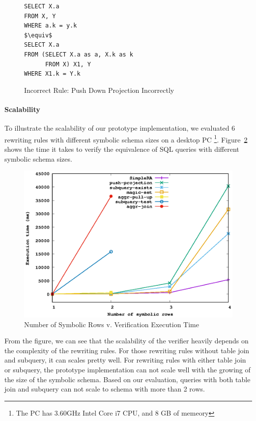 \begin{figure}[!htb]
\begin{lstlisting}[style=sql,xleftmargin=.3\textwidth,mathescape=true]
SELECT X.a
FROM X, Y
WHERE a.k = y.k
$\equiv$
SELECT X.a
FROM (SELECT X.a as a, X.k as k
      FROM X) X1, Y
WHERE X1.k = Y.k
\end{lstlisting}
\caption{Incorrect Rule: Push Down Projection Incorrectly}
\label{fig:push-proj}
\end{figure}

\paragraph{Scalability}
To illustrate the scalability of our prototype implementation, we evaluated
6 rewriting rules with different symbolic schema sizes on a desktop PC
\footnote{The PC has 3.60GHz Intel Core i7 CPU, and 8 GB of memeory}.
Figure~\ref{fig:scale} shows the time it takes to verify the equivalence of SQL queries
with different symbolic schema sizes.

\begin{figure}[ht]
  \centering
  \includegraphics[width=0.7\linewidth]{scale.eps}
  \caption{Number of Symbolic Rows v. Verification Execution Time}
  \label{fig:scale}
\end{figure}

From the figure, we can see that the scalability of the verifier heavily depends 
on the complexity of the rewriting rules.
For those rewriting rules without table join and subquery, it can scales pretty well.
For rewriting rules with either table join or subquery, the prototype implementation can 
not scale well with the growing of the size of the symbolic schema.
Based on our evaluation, queries with both table join and subquery can not scale to schema with
more than 2 rows.

